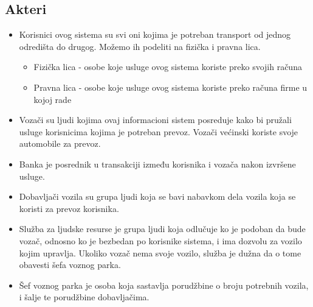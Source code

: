 \subsection{\bfseries Akteri}
\begin{itemize}
    \item Korisnici ovog sistema su svi oni kojima je potreban transport od jednog odredišta do drugog. Možemo ih podeliti na fizička i pravna lica. 
    \begin{itemize}
        \item Fizička lica - osobe koje usluge ovog sistema koriste preko svojih računa
        \item Pravna lica - osobe koje usluge ovog sistema koriste preko računa firme u kojoj rade
    \end{itemize}
    \item Vozači su ljudi kojima ovaj informacioni sistem posreduje kako bi pružali usluge korisnicima kojima je potreban prevoz. Vozači većinski koriste svoje automobile za prevoz.
    \item Banka je posrednik u transakciji između korisnika i vozača nakon izvršene usluge.
    \item Dobavljači vozila su grupa ljudi koja se bavi nabavkom dela vozila koja se koristi za prevoz korisnika.
    \item Služba za ljudske resurse je grupa ljudi koja odlučuje ko je podoban da bude vozač, odnosno ko je bezbedan po korisnike sistema, i ima dozvolu za vozilo kojim upravlja. Ukoliko vozač nema svoje vozilo, služba je dužna da o tome obavesti šefa voznog parka.
     \item Šef voznog parka je osoba koja sastavlja porudžbine o broju potrebnih vozila, i šalje te porudžbine dobavljačima.
\end{itemize}
